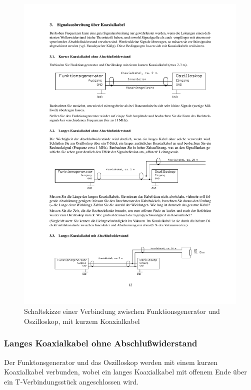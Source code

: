 \documentclass[12pt,a4paper]{article}
\begin{document}
\begin{figure}[H] 
  \centering
    \includegraphics[trim = 10mm 200mm 10mm 65mm, clip, scale = 1]{3-3_3.pdf}
  	\caption[Schaltskizze einer Verbindung zwischen Funktionsgenerator und Oszilloskop, mit kurzem Koaxialkabel]{Schaltskizze einer Verbindung zwischen Funktionsgenerator und Oszilloskop, mit kurzem Koaxialkabel\footnotemark}
  \label{fig:3.1}
\end{figure}

\subsubsection{Langes Koaxialkabel ohne Abschlußwiderstand}

Der Funktonsgenerator und das Oszilloskop werden mit einem kurzen Koaxialkabel verbunden, wobei ein langes Koaxialkabel mit offenem Ende über ein T-Verbindungsstück angeschlossen wird.
\end{document}
